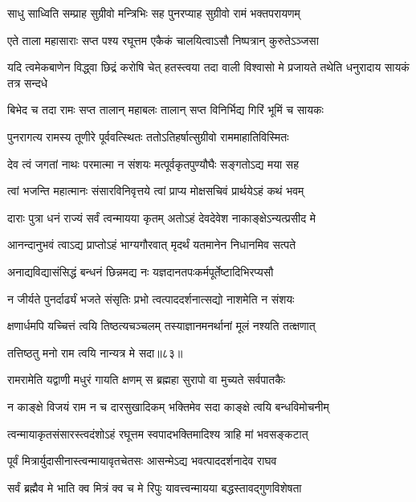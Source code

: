 \twolineshloka
{साधु साध्विति सम्प्राह सुग्रीवो मन्त्रिभिः सह}
{पुनरप्याह सुग्रीवो रामं भक्तपरायणम्} %

\twolineshloka
{एते ताला महासाराः सप्त पश्य रघूत्तम}
{एकैकं चालयित्वाऽसौ निष्पत्रान् कुरुतेऽञ्जसा} %

\threelineshloka
{यदि त्वमेकबाणेन विद्ध्वा छिद्रं करोषि चेत्}
{हतस्त्वया तदा वाली विश्वासो मे प्रजायते}
{तथेति धनुरादाय सायकं तत्र सन्दधे} %

\twolineshloka
{बिभेद च तदा रामः सप्त तालान् महाबलः}
{तालान् सप्त विनिर्भिद्य गिरिं भूमिं च सायकः} %

\twolineshloka
{पुनरागत्य रामस्य तूणीरे पूर्ववत्स्थितः}
{ततोऽतिहर्षात्सुग्रीवो राममाहातिविस्मितः} %

\twolineshloka
{देव त्वं जगतां नाथः परमात्मा न संशयः}
{मत्पूर्वकृतपुण्यौघैः सङ्गतोऽद्य मया सह} %

\twolineshloka
{त्वां भजन्ति महात्मानः संसारविनिवृत्तये}
{त्वां प्राप्य मोक्षसचिवं प्रार्थयेऽहं कथं भवम्} %

\twolineshloka
{दाराः पुत्रा धनं राज्यं सर्वं त्वन्मायया कृतम्}
{अतोऽहं देवदेवेश नाकाङ्क्षेऽन्यत्प्रसीद मे} %

\twolineshloka
{आनन्दानुभवं त्वाऽद्य प्राप्तोऽहं भाग्यगौरवात्}
{मृदर्थं यतमानेन निधानमिव सत्पते} %

\twolineshloka
{अनाद्यविद्यासंसिद्धं बन्धनं छिन्नमद्य नः}
{यज्ञदानतपःकर्मपूर्तेष्टादिभिरप्यसौ} %

\twolineshloka
{न जीर्यते पुनर्दार्ढ्यं भजते संसृतिः प्रभो}
{त्वत्पाददर्शनात्सद्यो नाशमेति न संशयः} %

\twolineshloka
{क्षणार्धमपि यच्चित्तं त्वयि तिष्ठत्यचञ्चलम्}
{तस्याज्ञानमनर्थानां मूलं नश्यति तत्क्षणात्} %

{तत्तिष्ठतु मनो राम त्वयि नान्यत्र मे सदा॥८३॥} %


\twolineshloka
{रामरामेति यद्वाणी मधुरं गायति क्षणम्}
{स ब्रह्महा सुरापो वा मुच्यते सर्वपातकैः} %

\twolineshloka
{न काङ्क्षे विजयं राम न च दारसुखादिकम्}
{भक्तिमेव सदा काङ्क्षे त्वयि बन्धविमोचनीम्} %

\twolineshloka
{त्वन्मायाकृतसंसारस्त्वदंशोऽहं रघूत्तम}
{स्वपादभक्तिमादिश्य त्राहि मां भवसङ्कटात्} %

\twolineshloka
{पूर्वं मित्रार्युदासीनास्त्वन्मायावृतचेतसः}
{आसन्मेऽद्य भवत्पाददर्शनादेव राघव} %

\twolineshloka
{सर्वं ब्रह्मैव मे भाति क्व मित्रं क्व च मे रिपुः}
{यावत्त्वन्मायया बद्धस्तावद्गुणविशेषता} %

